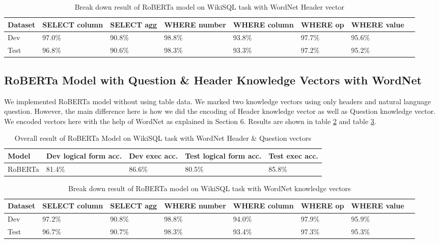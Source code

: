 \documentclass[12pt]{article}
\begin{document}
\begin{table}
\centering
 \begin{tabular}{| m{2cm} | m{2cm}| m{2cm} |m{2cm}| m{2cm} |m{2cm} | m{2cm} |m{2cm} |} 
 \hline
  Dataset & SELECT column & SELECT agg & WHERE number & WHERE column & WHERE op & WHERE value\\ 
 \hline\hline
  Dev & 97.0\% & 90.8\% & 98.8\% & 93.8\% & 97.7\% &  95.6\% \\ 
\hline
 Test & 96.8\% & 90.6\% & 98.3\% & 93.3\% & 97.2\% &  95.2\% \\ 
 \hline

\end{tabular}
\caption{Break down result of RoBERTa model on WikiSQL task with WordNet Header vector}
\label{robertatabledetailedoneheader}
\end{table}


\subsection{RoBERTa Model with Question \& Header Knowledge Vectors with WordNet}

We implemented RoBERTa model without using table data. We marked two knowledge vectors using only headers and natural language question. However, the main difference here is how we did the  encoding of Header knowledge vector as well as Question knowledge vector. We encoded vectors here with the help of WordNet as explained in Section 6. Results are shown in table \ref{robertatabletwoheader} and table \ref{robertatabledetailedtwoheader}.

 \begin{table}
\centering
 \begin{tabular}{| m{2cm} | m{2cm}| m{2cm} |m{2cm}| m{2cm} |} 
 \hline
Model & Dev logical form acc. & Dev exec acc. & Test logical form acc. & Test exec acc. \\ 
 \hline\hline
  RoBERTa & 81.4\% & 86.6\% & 80.5\% & 85.8\% \\ 
 \hline
\end{tabular}
\caption{Overall result of RoBERTa Model on WikiSQL task with WordNet Header \& Question vectors}
\label{robertatabletwoheader}
\end{table}


\begin{table}
\centering
 \begin{tabular}{| m{2cm} | m{2cm}| m{2cm} |m{2cm}| m{2cm} |m{2cm} | m{2cm} |m{2cm} |} 
 \hline
  Dataset & SELECT column & SELECT agg & WHERE number & WHERE column & WHERE op & WHERE value\\ 
 \hline\hline
  Dev & 97.2\% & 90.8\% & 98.8\% & 94.0\% & 97.9\% &  95.9\% \\ 
\hline
 Test & 96.7\% & 90.7\% & 98.3\% & 93.4\% & 97.3\% &  95.3\% \\ 
 \hline

\end{tabular}
\caption{Break down result of RoBERTa model on WikiSQL task with WordNet knowledge vectors}
\label{robertatabledetailedtwoheader}
\end{table}
\end{document}

